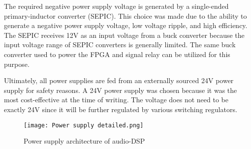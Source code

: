 The required negative power supply voltage is generated by a single-ended primary-inductor converter (SEPIC). This choice was made due to the ability to generate a negative power supply voltage, low voltage ripple, and high efficiency. The SEPIC receives 12V as an input voltage from a buck converter because the input voltage range of SEPIC converters is generally limited. The same buck converter used to power the FPGA and signal relay can be utilized for this purpose.

Ultimately, all power supplies are fed from an externally sourced 24V power supply for safety reasons. A 24V power supply was chosen because it was the most cost-effective at the time of writing. The voltage does not need to be exactly 24V since it will be further regulated by various switching regulators.

\begin{figure}[ht]
    \texttt{[image: Power supply detailed.png]}\\    
    \caption{Power supply architecture of audio-DSP}
    \label{fig:arch-power-supply}
\end{figure}